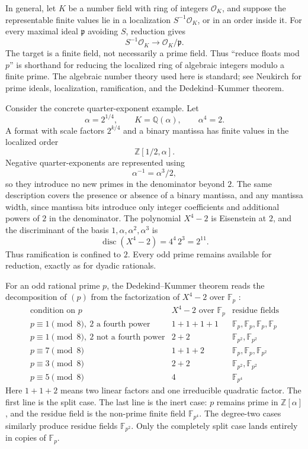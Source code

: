 \documentclass[11pt]{article}
\newcommand{\Z}{\mathbb{Z}}
\newcommand{\F}{\mathbb{F}}
\newcommand{\Q}{\mathbb{Q}}
\theoremstyle{plain}
\begin{document}
In general, let \(K\) be a number field with ring of integers \(\mathcal O_K\),
and suppose the representable finite values lie in a localization
\(S^{-1}\mathcal O_K\), or in an order inside it.  For every maximal ideal
\(\mathfrak p\) avoiding \(S\), reduction gives
\[
  S^{-1}\mathcal O_K \longrightarrow
  \mathcal O_K/\mathfrak p.
\]
The target is a finite field, not necessarily a prime field.  Thus ``reduce
floats mod \(p\)'' is shorthand for reducing the localized ring of algebraic
integers modulo a finite prime.  The algebraic number theory used here is
standard; see Neukirch \cite[Chapter I]{neukirch} for prime ideals,
localization, ramification, and the Dedekind--Kummer theorem.

Consider the concrete quarter-exponent example.  Let
\[
  \alpha = 2^{1/4},\qquad K=\Q(\alpha),\qquad \alpha^4=2.
\]
A format with scale factors \(2^{k/4}\) and a binary mantissa has finite values
in the localized order
\[
  \Z[1/2,\alpha].
\]
Negative quarter-exponents are represented using
\[
  \alpha^{-1}=\alpha^3/2,
\]
so they introduce no new primes in the denominator beyond \(2\).  The same
description covers the presence or absence of a binary mantissa, and any
mantissa width, since mantissa bits introduce only integer coefficients and
additional powers of \(2\) in the denominator.  The polynomial \(X^4-2\) is
Eisenstein at \(2\), and the discriminant of the basis
\(1,\alpha,\alpha^2,\alpha^3\) is
\[
  \operatorname{disc}(X^4-2)=4^4\,2^3=2^{11}.
\]
Thus ramification is confined to \(2\).  Every odd prime remains available for
reduction, exactly as for dyadic rationals.

For an odd rational prime \(p\), the Dedekind--Kummer theorem reads the
decomposition of \((p)\) from the factorization of \(X^4-2\) over \(\F_p\)
\cite[Chapter I]{neukirch}:
\[
\begin{array}{c|c|c}
\text{condition on }p & X^4-2\text{ over }\F_p
  & \text{residue fields}\\
\hline
p\equiv 1\pmod 8,\ 2\text{ a fourth power}
  & 1+1+1+1
  & \F_p,\F_p,\F_p,\F_p\\
p\equiv 1\pmod 8,\ 2\text{ not a fourth power}
  & 2+2
  & \F_{p^2},\F_{p^2}\\
p\equiv 7\pmod 8
  & 1+1+2
  & \F_p,\F_p,\F_{p^2}\\
p\equiv 3\pmod 8
  & 2+2
  & \F_{p^2},\F_{p^2}\\
p\equiv 5\pmod 8
  & 4
  & \F_{p^4}
\end{array}
\]
Here \(1+1+2\) means two linear factors and one irreducible quadratic factor.
The first line is the split case.  The last line is the inert case: \(p\)
remains prime in \(\Z[\alpha]\), and the residue field is the non-prime finite
field \(\F_{p^4}\).  The degree-two cases similarly produce residue fields
\(\F_{p^2}\).  Only the completely split case lands entirely in copies of
\(\F_p\).
\end{document}
